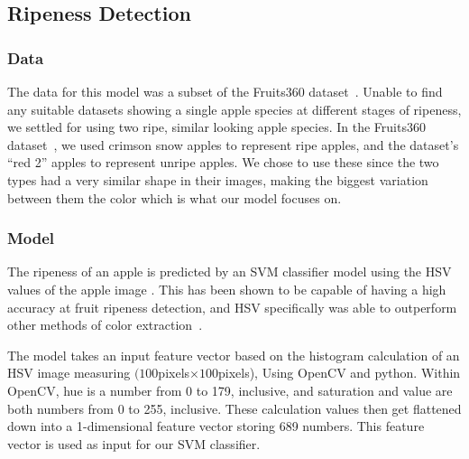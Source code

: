 \subsection{Ripeness Detection}
\subsubsection{Data}
The data for this model was a subset of the Fruits360 dataset~\cite{Fruit360}.
Unable to find any suitable datasets showing a single apple species at different stages of ripeness, we settled for using two ripe, similar looking apple species.
In the Fruits360 dataset~\cite{Fruit360}, we used crimson snow apples to represent ripe apples, and the dataset's ``red 2'' apples to represent unripe apples. We  chose to use these since the two types had a very similar shape in their images, making the biggest variation between them the color which is what our model focuses on.

\subsubsection{Model}
The ripeness of an apple is predicted by an SVM classifier model using the HSV values of the apple image . This has been shown to be capable of having a high accuracy at fruit ripeness detection, and HSV specifically was able to outperform other methods of color extraction~\cite{HSVRipeness}.

The model takes an input feature vector based on the histogram calculation of an HSV image measuring $(100$pixels$\times100$pixels), Using OpenCV and python.
Within OpenCV, hue is a number from 0 to 179, inclusive, and saturation and value are both numbers from 0 to 255, inclusive.
These calculation values then get flattened down into a 1-dimensional feature vector storing 689 numbers. 
This feature vector is used as input for our SVM classifier.

